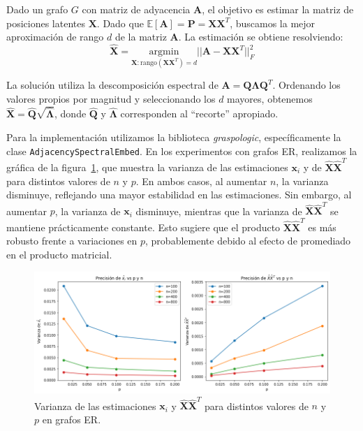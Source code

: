 \documentclass{article}
\begin{document}
Dado un grafo $G$ con matriz de adyacencia $\mathbf{A}$, el objetivo es estimar la matriz de posiciones latentes $\mathbf{X}$. Dado que $\mathbb{E}[\mathbf{A}] = \mathbf{P} = \mathbf{X}\mathbf{X}^T$, buscamos la mejor aproximación de rango $d$ de la matriz $\mathbf{A}$. La estimación se obtiene resolviendo:
\begin{equation}
    \hat{\mathbf{X}} = \underset{\mathbf{X}: \text{rango}(\mathbf{X}\mathbf{X}^T) = d}{\mathrm{argmin}} ||\mathbf{A} - \mathbf{X}\mathbf{X}^T||^2_F
\end{equation}

La solución utiliza la descomposición espectral de $\mathbf{A} = \mathbf{Q}\boldsymbol{\Lambda}\mathbf{Q}^T$. Ordenando los valores propios por magnitud y seleccionando los $d$ mayores, obtenemos $\hat{\mathbf{X}} = \hat{\mathbf{Q}}\sqrt{\hat{\boldsymbol{\Lambda}}}$, donde $\hat{\mathbf{Q}}$ y $\hat{\boldsymbol{\Lambda}}$ corresponden al ``recorte'' apropiado.

Para la implementación utilizamos la biblioteca \textit{graspologic}, específicamente la clase \newline
\verb|AdjacencySpectralEmbed|. En los experimentos con grafos ER, realizamos la gráfica de la figura~\ref{fig:precision}, que muestra la varianza de las estimaciones $\mathbf{x}_i$ y de $\hat{\mathbf{X}}\hat{\mathbf{X}}^T$ para distintos valores de $n$ y $p$. En ambos casos, al aumentar $n$, la varianza disminuye, reflejando una mayor estabilidad en las estimaciones. Sin embargo, al aumentar $p$, la varianza de $\mathbf{x}_i$ disminuye, mientras que la varianza de $\hat{\mathbf{X}}\hat{\mathbf{X}}^T$ se mantiene prácticamente constante. Esto sugiere que el producto $\hat{\mathbf{X}}\hat{\mathbf{X}}^T$ es más robusto frente a variaciones en $p$, probablemente debido al efecto de promediado en el producto matricial.

\begin{figure}[htb]
    \centering
    \includegraphics[width=0.8\linewidth]{images/precision.png}
    \caption{Varianza de las estimaciones $\mathbf{x}_i$ y $\hat{\mathbf{X}}\hat{\mathbf{X}}^T$ para distintos valores de $n$ y $p$ en grafos ER.}
    \label{fig:precision}
\end{figure}
\end{document}
